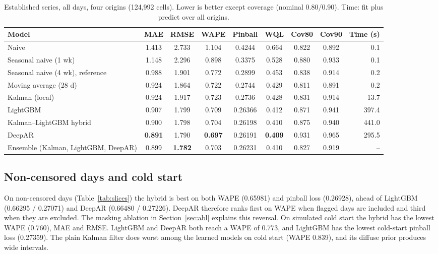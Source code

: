 \documentclass[conference]{IEEEtran}
\begin{document}
\begin{table}[t]
\caption{Established series, all days, four origins (124,992 cells). Lower is better except coverage (nominal 0.80/0.90). Time: fit plus predict over all origins.}
\label{tab:main}
\centering
\begin{tabular}{@{}lcccccccr@{}}
\toprule
Model & MAE & RMSE & WAPE & Pinball & WQL & Cov80 & Cov90 & Time (s)\\
\midrule
Naive & 1.413 & 2.733 & 1.104 & 0.4244 & 0.664 & 0.822 & 0.892 & 0.1\\
Seasonal naive (1 wk) & 1.148 & 2.296 & 0.898 & 0.3375 & 0.528 & 0.880 & 0.933 & 0.1\\
Seasonal naive (4 wk), reference & 0.988 & 1.901 & 0.772 & 0.2899 & 0.453 & 0.838 & 0.914 & 0.2\\
Moving average (28 d) & 0.924 & 1.864 & 0.722 & 0.2744 & 0.429 & 0.811 & 0.891 & 0.2\\
Kalman (local) & 0.924 & 1.917 & 0.723 & 0.2736 & 0.428 & 0.831 & 0.914 & 13.7\\
LightGBM & 0.907 & 1.799 & 0.709 & 0.26366 & 0.412 & 0.871 & 0.941 & 397.4\\
Kalman--LightGBM hybrid & 0.900 & 1.798 & 0.704 & 0.26198 & 0.410 & 0.875 & 0.940 & 441.0\\
DeepAR & \textbf{0.891} & 1.790 & \textbf{0.697} & 0.26191 & \textbf{0.409} & 0.931 & 0.965 & 295.5\\
Ensemble (Kalman, LightGBM, DeepAR) & 0.899 & \textbf{1.782} & 0.703 & 0.26231 & 0.410 & 0.827 & 0.919 & --\\
\bottomrule
\end{tabular}
\end{table}

\subsection{Non-censored days and cold start}
On non-censored days (Table~\ref{tab:slices}) the hybrid is best on both WAPE (0.65981) and pinball loss (0.26928), ahead of LightGBM (0.66295 / 0.27071) and DeepAR (0.66480 / 0.27226). DeepAR therefore ranks first on WAPE when flagged days are included and third when they are excluded. The masking ablation in Section~\ref{sec:abl} explains this reversal. On simulated cold start the hybrid has the lowest WAPE (0.760), MAE and RMSE. LightGBM and DeepAR both reach a WAPE of 0.773, and LightGBM has the lowest cold-start pinball loss (0.27359). The plain Kalman filter does worst among the learned models on cold start (WAPE 0.839), and its diffuse prior produces wide intervals.
\end{document}

